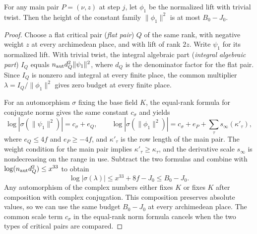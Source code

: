 \begin{lemma}
\label{lem:c-untwisted-main-pair}
\emitthmsource
For any main pair $P=(\nu,z)$ at step $j$, let $\phi_1$ be the normalized lift with trivial twist. Then the height of the constant family $\|\phi_1\|^2$ is at most $B_0-J_0$.
\end{lemma}
\begin{proof}
Choose a flat critical pair (\emph{flat pair}) $Q$ of the same rank, with negative weight $z$ at every archimedean place, and with lift of rank $2z$. Write $\psi_1$ for its normalized lift. With trivial twist, the integral algebraic part (\emph{integral algebraic part}) $I_Q$ equals $n_{\rm aut}d_Q^2\|\psi_1\|^2$, where $d_Q$ is the denominator factor for the flat pair. Since $I_Q$ is nonzero and integral at every finite place, the common multiplier $\lambda=I_Q/\|\phi_1\|^2$ gives zero budget at every finite place.

For an automorphism $\sigma$ fixing the base field $K$, the equal-rank formula for conjugate norms gives the same constant $c_\sigma$ and yields
\[
 \log|\sigma(\|\psi_1\|^2)|=c_\sigma+e_Q,\qquad
 \log|\sigma(\|\phi_1\|^2)|=c_\sigma+e_P+
     \sum_\tau s_\infty(\kappa'_\tau),
\]
where $e_Q\le4f$ and $e_P\ge-4f$, and $\kappa'_\tau$ is the row length of the main pair. The weight condition for the main pair implies $\kappa'_\tau\ge\kappa_\tau$, and the derivative scale $s_\infty$ is nondecreasing on the range in use. Subtract the two formulas and combine with $\log(n_{\rm aut}d_Q^2)\le x^{33}$ to obtain
\[
 \log|\sigma(\lambda)|\le x^{33}+8f-J_0\le B_0-J_0 .
\]
Any automorphism of the complex numbers either fixes $K$ or fixes $K$ after composition with complex conjugation. This composition preserves absolute values, so we can use the same budget $B_0-J_0$ at every archimedean place. The common scale term $c_\sigma$ in the equal-rank norm formula cancels when the two types of critical pairs are compared.
\end{proof}

